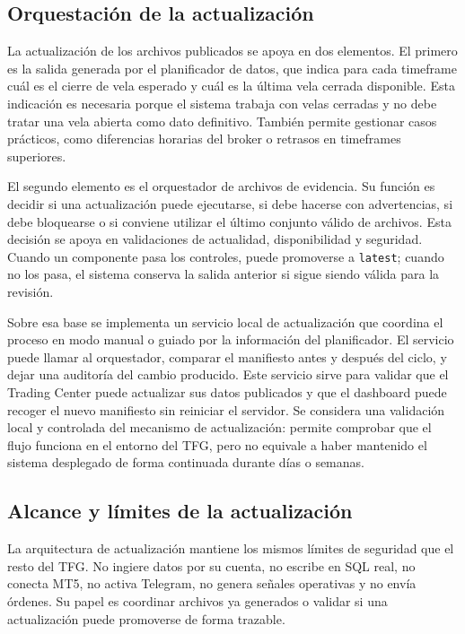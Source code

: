 \subsection{Orquestaci\'on de la actualizaci\'on}
\label{subsec:orquestacion-refresh}

La actualizaci\'on de los archivos publicados se apoya en dos elementos. El
primero es la salida generada por el planificador de datos, que indica
para cada timeframe cu\'al es el cierre
de vela esperado y cu\'al es la \'ultima vela cerrada disponible. Esta indicaci\'on
es necesaria porque el sistema trabaja con velas cerradas y no debe tratar una
vela abierta como dato definitivo. Tambi\'en permite gestionar casos pr\'acticos,
como diferencias horarias del broker o retrasos en timeframes superiores.

El segundo elemento es el orquestador de archivos de evidencia. Su funci\'on es
decidir si una
actualizaci\'on puede ejecutarse, si debe hacerse con advertencias, si debe
bloquearse o si conviene utilizar el \'ultimo conjunto v\'alido de archivos. Esta
decisi\'on se apoya en validaciones de actualidad, disponibilidad y seguridad.
Cuando un componente pasa los controles, puede promoverse a \texttt{latest};
cuando no los pasa, el sistema conserva la salida anterior si sigue siendo
v\'alida para la revisi\'on.

Sobre esa base se implementa un servicio local de actualizaci\'on que coordina el
proceso en modo manual o guiado por la informaci\'on del planificador. El
servicio puede llamar al
orquestador, comparar el manifiesto antes y despu\'es del ciclo, y dejar una
auditor\'ia del cambio producido. Este servicio sirve para validar que el Trading
Center puede actualizar sus datos publicados y que el dashboard puede recoger el
nuevo manifiesto sin reiniciar el servidor. Se considera una validaci\'on local y
controlada del mecanismo de actualizaci\'on: permite comprobar que el flujo
funciona en el entorno del TFG, pero no equivale a haber mantenido el sistema
desplegado de forma continuada durante d\'ias o semanas.

\subsection{Alcance y l\'imites de la actualizaci\'on}
\label{subsec:alcance-limites-refresh}

La arquitectura de actualizaci\'on mantiene los mismos l\'imites de seguridad que el
resto del TFG. No ingiere datos por su cuenta, no escribe en SQL real, no conecta
MT5, no activa Telegram, no genera se\~nales operativas y no env\'ia \'ordenes. Su
papel es coordinar archivos ya generados o validar si una actualizaci\'on puede
promoverse de forma trazable.

